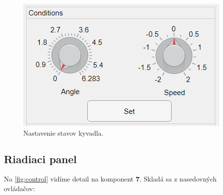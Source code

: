   \begin{figure}[h!]
 	\centering
 	\includegraphics[width=0.7\linewidth]{cond}
 	\caption{Nastavenie stavov kyvadla.}
 	\label{fig:cond}
 \end{figure}
 
 \subsection{Riadiaci panel}
 Na \cref{fig:control} vidíme detail na komponent \textbf{7}. Skladá sa z nasedovných ovládačov:
